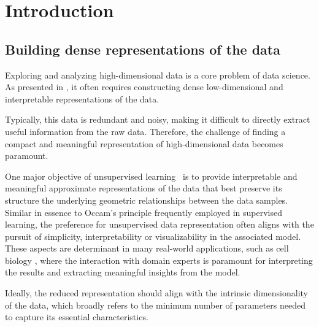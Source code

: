 \chapter{Introduction}\label{chap:intro}

\minitoc

\section{Building dense representations of the data}

Exploring and analyzing high-dimensional data is a core problem of data science. As presented in , it often requires constructing dense low-dimensional and interpretable representations of the data. 


Typically, this data is redundant and noisy, making it difficult to directly extract useful information from the raw data. Therefore, the challenge of finding a compact and meaningful representation of high-dimensional data becomes paramount.


One major objective of unsupervised learning~\citep{Hastie2009} is to provide interpretable and meaningful approximate representations of the data that best preserve its structure \ie the underlying geometric relationships between the data samples.
Similar in essence to Occam's principle frequently employed in supervised learning, the preference for unsupervised data representation often aligns with the pursuit of simplicity, interpretability or visualizability in the associated model.
These aspects are determinant in many real-world applications, such as cell biology
\citep{cantini2021benchmarking, ventre2023one}, where the interaction with domain experts is paramount for interpreting the results and extracting meaningful insights from the model. 

Ideally, the reduced representation should align with the intrinsic dimensionality of the data, which broadly refers to the minimum number of parameters needed to capture its essential characteristics.


